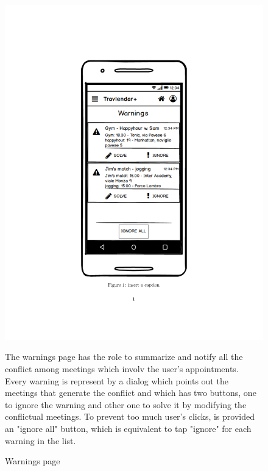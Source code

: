 	\begin{figure}
		\centering
		\includegraphics[width=0.6\linewidth]{mockups/Warnings}
		\caption{Warnings page}
		\label{fig:warnings}
		\begin{center}
			The warnings page has the role to summarize and notify all the conflict among meetings which involv the user's appointments. Every warning is represent by a dialog which points out the meetings that generate the conflict and which has two buttons, one to ignore the warning and other one to solve it by modifying the conflictual meetings. 
			To prevent too much user's clicks, is provided an "ignore all" button, which is equivalent to tap "ignore" for each warning in the list. 
		\end{center}
	\end{figure}

